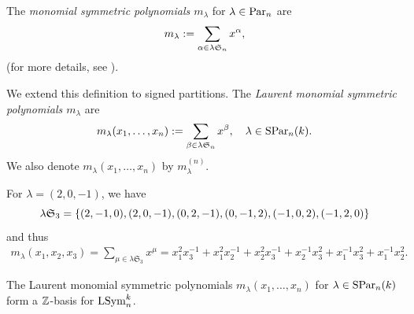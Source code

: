 \documentclass[11pt]{amsart}
\begin{document}
\begin{defin}
    The \emph{monomial symmetric polynomials $m_\lambda$} for $\lambda \in \mathrm{Par}_n$ are
\begin{align*}
    m_\lambda := \sum_{\alpha \in \lambda\mathfrak{S}_n} x^\alpha,
\end{align*}
(for more details, see \cite[Ch.~I, \S2, Eq.~(2.1)]{Mac15}).

We extend this definition to signed partitions. The \emph{Laurent monomial symmetric polynomials $m_\lambda$} are
\begin{align}
    m_\lambda(x_1, \dots, x_n) :=\sum_{\beta \in \lambda \mathfrak{S}_n} x^\beta, \quad \lambda \in \mathrm{SPar}_n(k).
\end{align}
We also denote $m_\lambda(x_1, \dots, x_n ) $ by $m_\lambda^{(n)}$.
\end{defin}


\begin{eg}
    For $\lambda=(2, 0, -1)$, 
    we have \[\lambda\mathfrak{S}_3 = \{(2,-1,0), (2,0,-1), (0,2,-1), (0,-1,2), (-1,0,2),(-1,2,0) \}\] and thus
    \begin{align*}
        m_{\lambda}(x_1, x_2, x_3)=\sum_{\mu \in \lambda \mathfrak{S}_3}x^\mu=x_1^2x_3^{-1}+x_1^2x_{2}^{-1}+x_2^2x_3^{-1}+x_2^{-1}x_3^2+x_{1}^{-1}x_3^2+x_1^{-1}x_2^2.
    \end{align*}
\end{eg}


\begin{prop}
    The Laurent monomial symmetric polynomials $m_\lambda(x_1, \dots, x_n)$ for $\lambda \in \mathrm{SPar}_n(k)$ form a $\mathbb{Z}$-basis for $\mathrm{LSym}_n^k$.
\end{prop}
\end{document}
